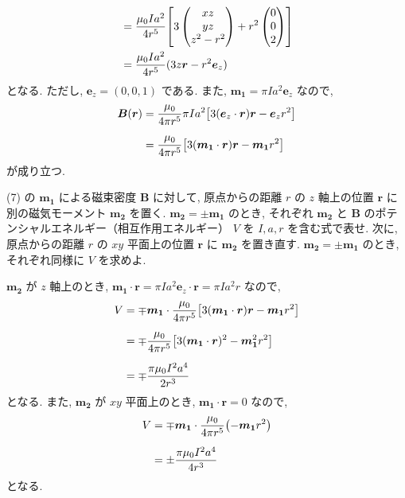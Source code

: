 \documentclass[../../ou-physics-exam.tex]{subfiles}
\begin{document}
\begin{answer}
\begin{align*}
        & = \frac{\mu_0 Ia^2}{4r^5} \qty[ 3 
        \begin{pmatrix}
            xz \\
            yz \\
            z^2 - r^2
        \end{pmatrix}
        + r^2 
        \begin{pmatrix}
            0 \\ 0 \\ 2
        \end{pmatrix} ] \\
        & = \frac{\mu_0 Ia^2}{4r^5} (3z \bm{r} - r^2 \bm{e}_z)
    \end{align*}
    となる. 
    ただし, $ \bm{e}_z = (0, 0, 1) $ である. 
    また, $ \bm{m_1} = \pi Ia^2 \bm{e}_z $ なので,
    \begin{align*}
        \bm{B} (\bm{r}) 
        & = \frac{\mu_0}{4 \pi r^5} \pi Ia^2 \qty[3 (\bm{e}_z \cdot \bm{r}) \bm{r} - \bm{e}_z r^2 ] \\[2mm]
        & = \frac{\mu_0}{4 \pi r^5} \qty[3 ( \bm{m_1} \cdot \bm{r}) \bm{r} - \bm{m_1} r^2 ]
    \end{align*}
    が成り立つ.
\end{answer}

(7) の $ \bm{m_1} $ による磁束密度 $ \bm{B} $ に対して, 原点からの距離 $ r $ の $ z $ 軸上の位置 $ \bm{r} $ に別の磁気モーメント $ \bm{m_2} $ を置く. 
$ \bm{m_2} = \pm \bm{m_1} $ のとき, それぞれ $ \bm{m_2} $ と $ \bm{B} $ のポテンシャルエネルギー（相互作用エネルギー） $ V $ を $ I, a, r $ を含む式で表せ. 
次に, 原点からの距離 $ r $ の $ xy $ 平面上の位置 $ \bm{r} $ に $ \bm{m_2} $ を置き直す. 
$ \bm{m_2} = \pm \bm{m_1} $ のとき, それぞれ同様に $ V $ を求めよ.
\begin{answer}
    $ \bm{m_2} $ が $ z $ 軸上のとき, $ \bm{m_1} \cdot \bm{r} = \pi Ia^2 \bm{e}_z \cdot \bm{r} = \pi Ia^2 r $ なので,
    \begin{align*}
        V 
        & = \mp \bm{m_1} \cdot \frac{\mu_0}{4 \pi r^5} \qty[3 ( \bm{m_1} \cdot \bm{r}) \bm{r} - \bm{m_1} r^2 ] \\[2mm]
        & = \mp \frac{\mu_0}{4 \pi r^5} \qty[3 (\bm{m_1} \cdot \bm{r})^2 - \bm{m_1}^2 r^2] \\[2mm]
        & = \mp \frac{\pi \mu_0 I^2 a^4}{2 r^3}
    \end{align*}
    となる. 
    また, $ \bm{m_2} $ が $ xy $ 平面上のとき, $ \bm{m_1} \cdot \bm{r} = 0 $ なので,
    \begin{align*}
        V 
        & = \mp \bm{m_1} \cdot \frac{\mu_0}{4 \pi r^5} \qty(- \bm{m_1} r^2 ) \\[2mm]
        & = \pm \frac{\pi \mu_0 I^2 a^4}{4 r^3} 
    \end{align*}
    となる.
\end{answer}
\end{document}

